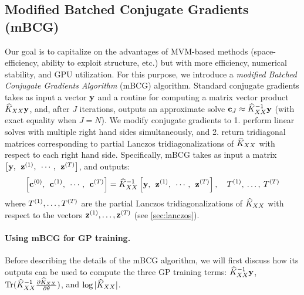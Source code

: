 \subsection{Modified Batched Conjugate Gradients (mBCG)}
Our goal is to capitalize on the advantages of MVM-based methods (space-efficiency, ability to exploit structure, etc.) but with more efficiency, numerical stability, and GPU utilization.
For this purpose, we introduce a \emph{modified Batched Conjugate Gradients Algorithm} (mBCG) algorithm.
Standard conjugate gradients takes as input a vector $\mathbf{y}$ and a routine for computing a matrix vector product $\widehat{K}_{XX}\mathbf{y}$, and, after $J$ iterations, outputs an approximate solve $\mathbf{c}_{J} \approx \widehat{K}_{XX}^{-1}\mathbf{y}$ (with exact equality when $J = N$).
We modify conjugate gradients to 1. perform linear solves with multiple right hand sides simultaneously, and 2. return tridiagonal matrices corresponding to partial Lanczos tridiagonalizations of $\widehat{K}_{XX}$ with respect to each right hand side.
Specifically, mBCG takes as input a matrix $\left[ \mathbf{y}, \:\: \mathbf{z}^{(1)}, \:\: \cdots, \:\: \mathbf{z}^{(T)} \right]$, and outputs:
\begin{equation}
  \label{eq:mod_cg_call}
  \left[ \mathbf{c}^{(0)}, \:\: \mathbf{c}^{(1)}, \:\: \cdots, \:\: \mathbf{c}^{(T)} \right] = \widehat{K}_{XX}^{-1} \left[ \mathbf{y}, \:\: \mathbf{z}^{(1)}, \:\: \cdots, \:\: \mathbf{z}^{(T)} \right], \quad T^{(1)}, \: \ldots, \: T^{(T)}
\end{equation}
where $T^{(1)}, \ldots, T^{(T)}$ are the partial Lanczos tridiagonalizations of $\widehat{K}_{XX}$ with respect to the vectors $\mathbf{z}^{(1)}, \ldots, \mathbf{z}^{(T)}$ (see \cref{sec:lanczos}).

\paragraph{Using mBCG for GP training.}
Before describing the details of the mBCG algorithm, we will first discuss how its outputs can be used to compute the three GP training terms:
$\widehat{K}_{XX}^{-1} \mathbf{y}$, $\tr{ \trainK^{-1} \frac{\partial \trainK}{\partial \theta} }$, and $\log \vert \widehat{K}_{XX} \vert$.

